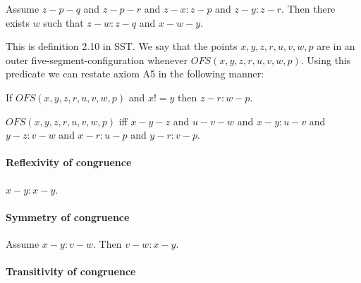 \documentclass{article}
\begin{document}
  \begin{forthel}
    \begin{axiom}[CA]
      Assume $z-p-q$ and $z-p-r$ and $z-x : z-p$ and $z-y : z-r$. Then there exists $w$ such that $z-w : z-q$ and $x-w-y$.
    \end{axiom}
  \end{forthel}


  This is definition 2.10 in SST. We say that the points $x,y,z,r,u,v,w,p$ are in an outer five-segment-configuration whenever $OFS(x,y,z,r,u,v,w,p)$. Using this predicate we can restate axiom A5 in the following manner:

  \begin{axiom}[A5']
    If $OFS(x,y,z,r,u,v,w,p)$ and $x != y$ then $z-r : w-p$.
  \end{axiom}

  \begin{forthel}
    \begin{definition}[OFS]
      $OFS(x,y,z,r,u,v,w,p)$ iff $x-y-z$ and $u-v-w$ and $x-y : u-v$ and $y-z : v-w$ and $x-r : u-p$ and $y-r : v-p$.
    \end{definition}
  \end{forthel}


  \paragraph{Reflexivity of congruence}

  \begin{forthel}
    \begin{lemma}[L2o1]
      $x-y : x-y$.
    \end{lemma}
  \end{forthel}


  \paragraph{Symmetry of congruence}

  \begin{forthel}
    \begin{lemma}[L2o2]
      Assume $x-y : v-w$. Then $v-w : x-y$.
    \end{lemma}
  \end{forthel}


  \paragraph{Transitivity of congruence}
\end{document}
